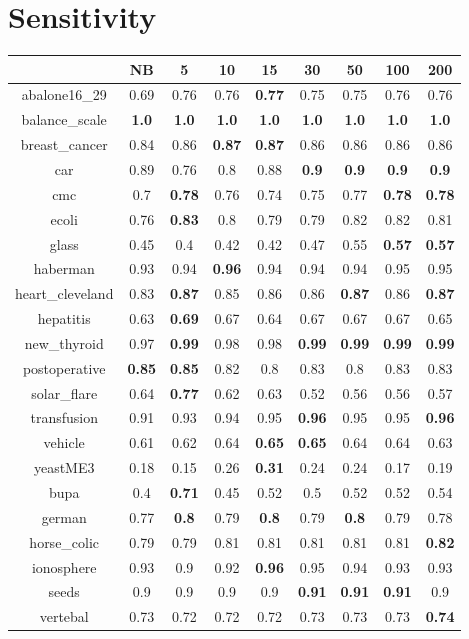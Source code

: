 \documentclass{article}%
\begin{document}
%
\section*{Sensitivity}%
\begin{tabular}{c|cccccccc}%
\hline%
&NB&5&10&15&30&50&100&200\\%
\hline%
abalone16\_29&0.69&0.76&0.76&\textbf{0.77}&0.75&0.75&0.76&0.76\\%
\hline%
balance\_scale&\textbf{1.0}&\textbf{1.0}&\textbf{1.0}&\textbf{1.0}&\textbf{1.0}&\textbf{1.0}&\textbf{1.0}&\textbf{1.0}\\%
\hline%
breast\_cancer&0.84&0.86&\textbf{0.87}&\textbf{0.87}&0.86&0.86&0.86&0.86\\%
\hline%
car&0.89&0.76&0.8&0.88&\textbf{0.9}&\textbf{0.9}&\textbf{0.9}&\textbf{0.9}\\%
\hline%
cmc&0.7&\textbf{0.78}&0.76&0.74&0.75&0.77&\textbf{0.78}&\textbf{0.78}\\%
\hline%
ecoli&0.76&\textbf{0.83}&0.8&0.79&0.79&0.82&0.82&0.81\\%
\hline%
glass&0.45&0.4&0.42&0.42&0.47&0.55&\textbf{0.57}&\textbf{0.57}\\%
\hline%
haberman&0.93&0.94&\textbf{0.96}&0.94&0.94&0.94&0.95&0.95\\%
\hline%
heart\_cleveland&0.83&\textbf{0.87}&0.85&0.86&0.86&\textbf{0.87}&0.86&\textbf{0.87}\\%
\hline%
hepatitis&0.63&\textbf{0.69}&0.67&0.64&0.67&0.67&0.67&0.65\\%
\hline%
new\_thyroid&0.97&\textbf{0.99}&0.98&0.98&\textbf{0.99}&\textbf{0.99}&\textbf{0.99}&\textbf{0.99}\\%
\hline%
postoperative&\textbf{0.85}&\textbf{0.85}&0.82&0.8&0.83&0.8&0.83&0.83\\%
\hline%
solar\_flare&0.64&\textbf{0.77}&0.62&0.63&0.52&0.56&0.56&0.57\\%
\hline%
transfusion&0.91&0.93&0.94&0.95&\textbf{0.96}&0.95&0.95&\textbf{0.96}\\%
\hline%
vehicle&0.61&0.62&0.64&\textbf{0.65}&\textbf{0.65}&0.64&0.64&0.63\\%
\hline%
yeastME3&0.18&0.15&0.26&\textbf{0.31}&0.24&0.24&0.17&0.19\\%
\hline%
bupa&0.4&\textbf{0.71}&0.45&0.52&0.5&0.52&0.52&0.54\\%
\hline%
german&0.77&\textbf{0.8}&0.79&\textbf{0.8}&0.79&\textbf{0.8}&0.79&0.78\\%
\hline%
horse\_colic&0.79&0.79&0.81&0.81&0.81&0.81&0.81&\textbf{0.82}\\%
\hline%
ionosphere&0.93&0.9&0.92&\textbf{0.96}&0.95&0.94&0.93&0.93\\%
\hline%
seeds&0.9&0.9&0.9&0.9&\textbf{0.91}&\textbf{0.91}&\textbf{0.91}&0.9\\%
\hline%
vertebal&0.73&0.72&0.72&0.72&0.73&0.73&0.73&\textbf{0.74}\\%
\hline%
\end{tabular}
\end{document}
